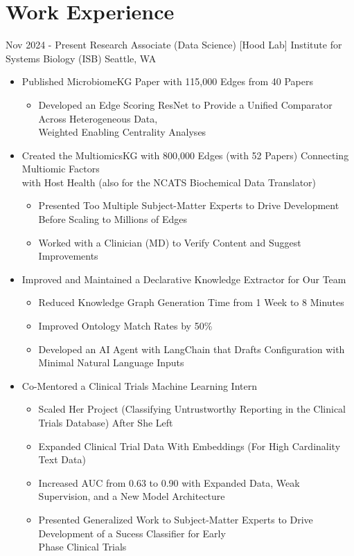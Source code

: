 \documentclass[11pt]{moderncv}
\begin{document}
\section{Work Experience}
\cventry
{Nov 2024 - Present}
{Research Associate (Data Science) [Hood Lab]}
{Institute for Systems Biology (ISB)}
{Seattle, WA}
{}
{%
\begin{itemize}
\item Published MicrobiomeKG Paper with 115,000 Edges from 40 Papers
  \begin{itemize}
  \item Developed an Edge Scoring ResNet to Provide a Unified Comparator Across Heterogeneous Data,
        \\ Weighted Enabling Centrality Analyses
  \end{itemize}
\item Created the MultiomicsKG with 800,000 Edges (with 52 Papers) Connecting Multiomic Factors
      \\ with Host Health (also for the NCATS Biochemical Data Translator)
  \begin{itemize}
  \item Presented Too Multiple Subject-Matter Experts to Drive Development Before Scaling to Millions of Edges
  \item Worked with a Clinician (MD) to Verify Content and Suggest Improvements
  \end{itemize}
\item Improved and Maintained a Declarative Knowledge Extractor for Our Team
  \begin{itemize}
  \item Reduced Knowledge Graph Generation Time from 1 Week to 8 Minutes
  \item Improved Ontology Match Rates by 50\%
  \item Developed an AI Agent with LangChain that Drafts Configuration with Minimal Natural Language Inputs
  \end{itemize}
\item Co-Mentored a Clinical Trials Machine Learning Intern
  \begin{itemize}
  \item Scaled Her Project (Classifying Untrustworthy Reporting in the Clinical Trials Database) After She Left
  \item Expanded Clinical Trial Data With Embeddings (For High Cardinality Text Data)
  \item Increased AUC from 0.63 to 0.90 with Expanded Data, Weak Supervision, and a New Model Architecture
  \item Presented Generalized Work to Subject-Matter Experts to Drive Development of a Sucess Classifier for Early
        \\ Phase Clinical Trials
  \end{itemize}
\end{itemize}
}
\end{document}

